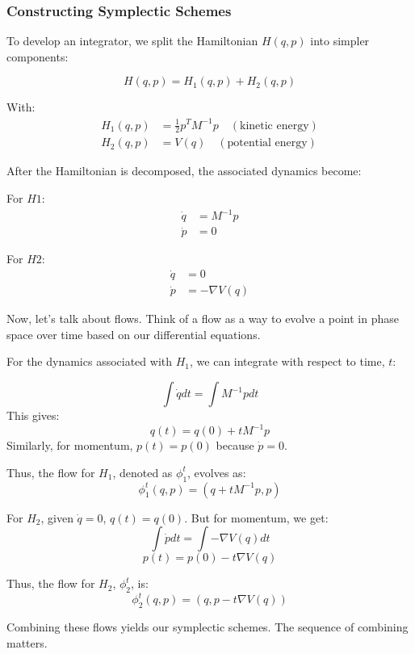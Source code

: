 \documentclass{article}
\begin{document}
\subsubsection{Constructing Symplectic Schemes}
\label{sec:constructing_symplectic_schemes}

To develop an integrator, we split the Hamiltonian \(H(q,p)\) into simpler components:

\begin{equation*}
	H(q,p) = H_1(q,p) + H_2(q,p)
\end{equation*}

With:
\begin{align*}
	H_1(q,p) & = \frac{1}{2} p^T M^{-1} p \quad (\text{kinetic energy}) \\
	H_2(q,p) & = V(q) \quad (\text{potential energy})
\end{align*}

After the Hamiltonian is decomposed, the associated dynamics become:

For \(H1\):
\begin{align*}
	\dot{q} &= M^{-1}p \\
	\dot{p} &= 0
\end{align*}

For \(H2\):
\begin{align*}
	\dot{q} &= 0 \\
	\dot{p} &= -\nabla V(q)
\end{align*}

Now, let's talk about flows. Think of a flow as a way to evolve a point in phase space over time based on our differential equations.

For the dynamics associated with \(H_1\), we can integrate with respect to time, \( t \):

\[ \int \dot{q} dt = \int M^{-1}p dt \]
This gives:
\[ q(t) = q(0) + tM^{-1}p \]
Similarly, for momentum, \( p(t) = p(0) \) because \(\dot{p}=0\). 

Thus, the flow for \(H_1\), denoted as \(\phi_1^t\), evolves as:
\[ \phi_1^t(q, p) = (q + tM^{-1}p, p) \]

For \(H_2\), given \(\dot{q} = 0\), \( q(t) = q(0) \). But for momentum, we get:
\[ \int \dot{p} dt = \int -\nabla V(q) dt \]
\[ p(t) = p(0) - t\nabla V(q) \]

Thus, the flow for \(H_2\), \(\phi_2^t\), is:
\[ \phi_2^t(q, p) = (q, p - t\nabla V(q)) \]

Combining these flows yields our symplectic schemes. The sequence of combining matters.
\end{document}
